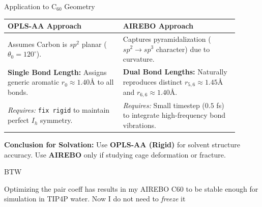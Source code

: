 \documentclass[aspectratio=169, 10pt]{beamer}
\begin{document}
\begin{frame}{Application to C$_{60}$ Geometry}

    \begin{table}
        \centering
        \renewcommand{\arraystretch}{1.5}
        \begin{tabular}{p{0.45\linewidth} | p{0.45\linewidth}}
            \toprule
            \centering \textbf{OPLS-AA Approach} & \centering \textbf{AIREBO Approach} \tabularnewline
            \midrule
            Assumes Carbon is $sp^2$ planar ($\theta_0 = 120^\circ$). & Captures pyramidalization ($sp^2 \to sp^3$ character) due to curvature. \\
            
            \textbf{Single Bond Length:} Assigns generic aromatic $r_0 \approx 1.40\text{\AA}$ to all bonds. & \textbf{Dual Bond Lengths:} Naturally reproduces distinct $r_{5,6} \approx 1.45\text{\AA}$ and $r_{6,6} \approx 1.40\text{\AA}$. \\
            
            \textit{Requires:} \texttt{fix rigid} to maintain perfect $I_h$ symmetry. & \textit{Requires:} Small timestep ($0.5$ fs) to integrate high-frequency bond vibrations. \\
            \bottomrule
        \end{tabular}
    \end{table}

    \vspace{1em}
    \centering
    \textbf{Conclusion for Solvation:} Use \textbf{OPLS-AA (Rigid)} for solvent structure accuracy. Use \textbf{AIREBO} only if studying cage deformation or fracture.

\end{frame}

\begin{frame}{BTW}

\Large
\centering
Optimizing the pair coeff has results in my AIREBO C60 to be stable enough for simulation in TIP4P water. Now I do not need to \textit{freeze} it
    
\end{frame}
\end{document}

